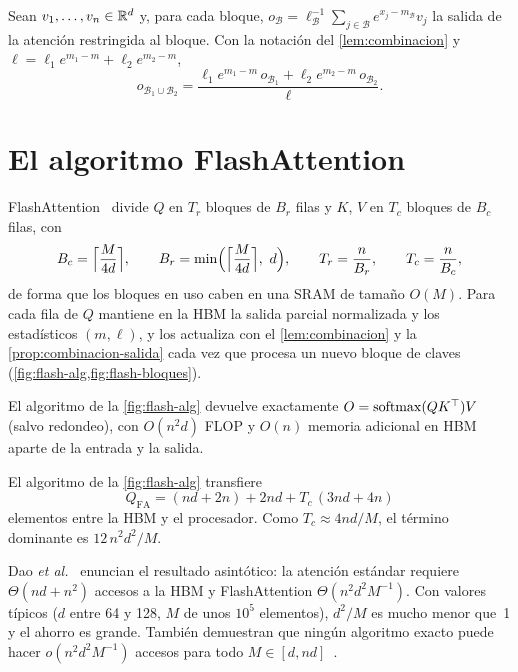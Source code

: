 \begin{proposicion}\label{prop:combinacion-salida}
Sean $v_1,\dots,v_n\in\mathbb{R}^{d}$ y, para cada bloque, $o_{\mathcal{B}}=\ell_{\mathcal{B}}^{-1}\sum_{j\in\mathcal{B}}e^{x_j-m_{\mathcal{B}}}v_j$ la salida de la atención restringida al bloque. Con la notación del \cref{lem:combinacion} y $\ell=\ell_1e^{m_1-m}+\ell_2e^{m_2-m}$,
\[
o_{\mathcal{B}_1\cup\mathcal{B}_2}=\frac{\ell_1e^{m_1-m}\,o_{\mathcal{B}_1}+\ell_2e^{m_2-m}\,o_{\mathcal{B}_2}}{\ell}.
\]
\end{proposicion}

\addtocounter{definicion}{1}%

\section{El algoritmo FlashAttention}

FlashAttention~\cite[algoritmo~1]{flash} divide $Q$ en $T_r$ bloques de $B_r$ filas y $K$, $V$ en $T_c$ bloques de $B_c$ filas, con
\[
B_c=\Bigl\lceil\frac{M}{4d}\Bigr\rceil,\qquad B_r=\min\Bigl(\Bigl\lceil\frac{M}{4d}\Bigr\rceil,\ d\Bigr),\qquad T_r=\frac{n}{B_r},\qquad T_c=\frac{n}{B_c},
\]
de forma que los bloques en uso caben en una SRAM de tamaño $O(M)$. Para cada fila de $Q$ mantiene en la HBM la salida parcial normalizada y los estadísticos $(m,\ell)$, y los actualiza con el \cref{lem:combinacion} y la \cref{prop:combinacion-salida} cada vez que procesa un nuevo bloque de claves (\cref{fig:flash-alg,fig:flash-bloques}).

\addtocounter{figure}{1}%

\addtocounter{figure}{1}%

\begin{teorema}\label{teo:flash-exacto}
El algoritmo de la \cref{fig:flash-alg} devuelve exactamente $O=\operatorname{softmax}(QK^{\top})V$ (salvo redondeo), con $O(n^{2}d)$ FLOP y $O(n)$ memoria adicional en HBM aparte de la entrada y la salida.
\end{teorema}

\begin{proposicion}\label{prop:flash-trafico}
El algoritmo de la \cref{fig:flash-alg} transfiere
\[
Q_{\mathrm{FA}}=(nd+2n)+2nd+T_c\,(3nd+4n)
\]
elementos entre la HBM y el procesador. Como $T_c\approx 4nd/M$, el término dominante es $12\,n^{2}d^{2}/M$.
\end{proposicion}

Dao \emph{et al.}~\cite[teorema~2]{flash} enuncian el resultado asintótico: la atención estándar requiere $\Theta(nd+n^{2})$ accesos a la HBM y FlashAttention $\Theta(n^{2}d^{2}M^{-1})$. Con valores típicos ($d$ entre 64 y 128, $M$ de unos $10^{5}$ elementos), $d^{2}/M$ es mucho menor que~1 y el ahorro es grande. También demuestran que ningún algoritmo exacto puede hacer $o(n^{2}d^{2}M^{-1})$ accesos para todo $M\in[d,nd]$~\cite[proposición~3]{flash}.

